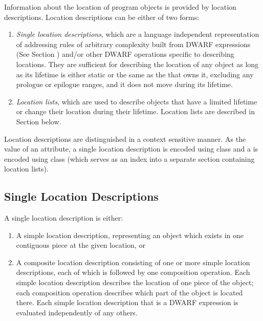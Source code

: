 Information about the location of program objects is provided
by location descriptions. Location descriptions can be either
of two forms:
\begin{enumerate}[1. ]
\item \textit{Single location descriptions}, 
which 
are 
a language independent representation of
addressing rules of arbitrary complexity built from 
DWARF expressions (See Section ) 
and/or other
DWARF operations specific to describing locations. They are
sufficient for describing the location of any object as long
as its lifetime is either static or the same as the 
 that owns it,
\bb
excluding any prologue or epilogue ranges,
\eb 
and it does not move during its lifetime.


\item \textit{Location lists}, which are used to 
describe
objects that have a limited lifetime or change their location
during their lifetime. Location lists are described in
Section  below.

\end{enumerate}

Location descriptions are distinguished in a context sensitive
manner. As the value of an attribute, a 
\bb
single
\eb
location description is encoded using class 
\bb
\CLASSlocdesc{}
\eb
and a  is encoded
using class \CLASSloclist{} (which serves as an 
index into a separate section containing location lists).

\subsection{Single Location Descriptions}
\label{chap:singlelocationdescriptions}
A single location description is either:
\begin{enumerate}[1. ]
\item A simple location description, representing an object
which 
exists in one contiguous piece at the given location, or 
\item A composite location description consisting of one or more
simple location descriptions, each of which is followed by
one composition operation. Each simple location description
describes the location of one piece of the object; each
composition operation describes which part of the object is
located there. Each simple location description that is a
DWARF expression is evaluated independently of any others.
\end{enumerate}


